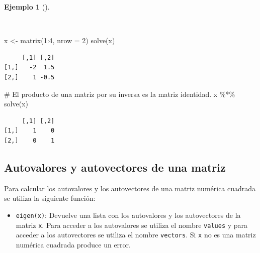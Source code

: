 \documentclass[
  a4paper,
]{scrreport}
\newenvironment{Shaded}{\begin{snugshade}}{\end{snugshade}}
\newcommand{\AttributeTok}[1]{\textcolor[rgb]{0.40,0.45,0.13}{#1}}
\newcommand{\CommentTok}[1]{\textcolor[rgb]{0.37,0.37,0.37}{#1}}
\newcommand{\DecValTok}[1]{\textcolor[rgb]{0.68,0.00,0.00}{#1}}
\newcommand{\FunctionTok}[1]{\textcolor[rgb]{0.28,0.35,0.67}{#1}}
\newcommand{\NormalTok}[1]{\textcolor[rgb]{0.00,0.23,0.31}{#1}}
\newcommand{\OtherTok}[1]{\textcolor[rgb]{0.00,0.23,0.31}{#1}}
\newcommand{\SpecialCharTok}[1]{\textcolor[rgb]{0.37,0.37,0.37}{#1}}
\providecommand{\tightlist}{%
  \setlength{\itemsep}{0pt}\setlength{\parskip}{0pt}}\usepackage{longtable,booktabs,array}
\theoremstyle{definition}
\theoremstyle{definition}
\newtheorem{example}{Ejemplo}[chapter]
\theoremstyle{remark}
\begin{document}
\begin{example}[]\protect\hypertarget{exm-inversa-matriz}{}\label{exm-inversa-matriz}

~

\begin{Shaded}
\begin{Highlighting}[]
\NormalTok{x }\OtherTok{\textless{}{-}} \FunctionTok{matrix}\NormalTok{(}\DecValTok{1}\SpecialCharTok{:}\DecValTok{4}\NormalTok{, }\AttributeTok{nrow =} \DecValTok{2}\NormalTok{)}
\FunctionTok{solve}\NormalTok{(x)}
\end{Highlighting}
\end{Shaded}

\begin{verbatim}
     [,1] [,2]
[1,]   -2  1.5
[2,]    1 -0.5
\end{verbatim}

\begin{Shaded}
\begin{Highlighting}[]
\CommentTok{\# El producto de una matriz por su inversa es la matriz identidad.}
\NormalTok{x }\SpecialCharTok{\%*\%} \FunctionTok{solve}\NormalTok{(x)}
\end{Highlighting}
\end{Shaded}

\begin{verbatim}
     [,1] [,2]
[1,]    1    0
[2,]    0    1
\end{verbatim}

\end{example}

\subsection{Autovalores y autovectores de una
matriz}\label{autovalores-y-autovectores-de-una-matriz}

Para calcular los autovalores y los autovectores de una matriz numérica
cuadrada se utiliza la siguiente función:

\begin{itemize}
\tightlist
\item
  \texttt{eigen(x)}: Devuelve una lista con los autovalores y los
  autovectores de la matriz \texttt{x}. Para acceder a los autovalores
  se utiliza el nombre \texttt{values} y para acceder a los autovectores
  se utiliza el nombre \texttt{vectors}. Si \texttt{x} no es una matriz
  numérica cuadrada produce un error.
\end{itemize}
\end{document}
